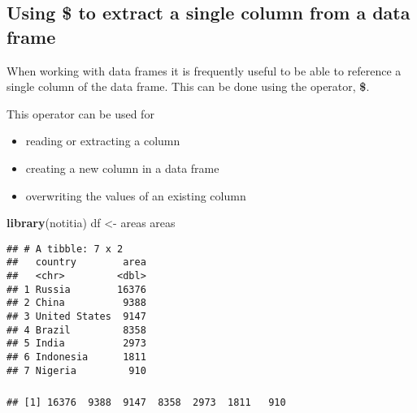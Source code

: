 \documentclass[]{book}
\newenvironment{Shaded}{\begin{snugshade}}{\end{snugshade}}
\newcommand{\KeywordTok}[1]{\textcolor[rgb]{0.13,0.29,0.53}{\textbf{#1}}}
\newcommand{\NormalTok}[1]{#1}
\newcommand{\OperatorTok}[1]{\textcolor[rgb]{0.81,0.36,0.00}{\textbf{#1}}}
\newcommand{\StringTok}[1]{\textcolor[rgb]{0.31,0.60,0.02}{#1}}
\providecommand{\tightlist}{%
  \setlength{\itemsep}{0pt}\setlength{\parskip}{0pt}}
\begin{document}
\hypertarget{dollarsign}{%
\subsection*{\texorpdfstring{Using \textbf{\$} to extract a single column from a data frame}{Using \$ to extract a single column from a data frame}}\label{dollarsign}}

When working with data frames it is frequently useful to be able to reference a single column of the data frame. This can be done using the operator, \textbf{\$}.

This operator can be used for

\begin{itemize}
\tightlist
\item
  reading or extracting a column
\item
  creating a new column in a data frame
\item
  overwriting the values of an existing column
\end{itemize}

\begin{Shaded}
\begin{Highlighting}[]
\KeywordTok{library}\NormalTok{(notitia)}
\NormalTok{df <-}\StringTok{ }\NormalTok{areas}
\NormalTok{areas}
\end{Highlighting}
\end{Shaded}

\begin{verbatim}
## # A tibble: 7 x 2
##   country        area
##   <chr>         <dbl>
## 1 Russia        16376
## 2 China          9388
## 3 United States  9147
## 4 Brazil         8358
## 5 India          2973
## 6 Indonesia      1811
## 7 Nigeria         910
\end{verbatim}

\hypertarget{dollarsignread}{%
\subsubsection*{}\label{dollarsignread}}

\begin{Shaded}
\end{Shaded}

\begin{verbatim}
## [1] 16376  9388  9147  8358  2973  1811   910
\end{verbatim}
\end{document}
